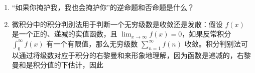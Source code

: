 \begin{enumerate}
  找出下列句子的逆否命题。
  \begin{enumerate}
    \item \wbitemsep 
    如果你承担不了后果，就不要做坏事。
    \item \wbitemsep 
    如果你在学校表现好，你就会找到一份好工作。
    \item \wbitemsep 
    如果你希望别人以某种方式对待你，你必须以那种方式对待别人。
    \item \wbitemsep 
    如果下雨，就一定有云。
    \item \wbitemsep 
  如果对于所有的 $n$ 都有 $a_n \leq b_n$，并且 $\sum_{n=0}^\infty b_n$ 是一个收敛级数，那么 $\sum_{n=0}^\infty a_n$ 也是一个收敛级数。
  \end{enumerate}
  
  
  \rule{0pt}{0pt}
  
  
  \workbookpagebreak
  
  \item 
  “如果你掩护我，我也会掩护你”的逆命题和否命题是什么？
  \wbvfill
  
  
  \item 
  
  微积分中的积分判别法用于判断一个无穷级数是收敛还是发散：假设 $f(x)$ 是一个正的、递减的实值函数，且 $\lim_{x \longrightarrow \infty} f(x) = 0$，如果反常积分 $\int_0^\infty f(x)$ 有一个有限值，那么无穷级数 $\sum_{n=1}^\infty f(n)$ 收敛。积分判别法可以通过将级数对应于积分的右黎曼和来形象地理解，因为函数是递减的，右黎曼和是积分值的下估计，因此
  

\end{enumerate}
